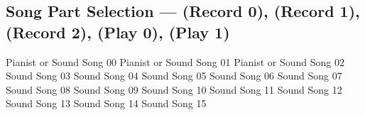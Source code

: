 \subsection[Song Part Selection]{Song Part Selection --- \UiKey{\I}\UiKey{\REC} (Record 0), \UiKey{\II}\UiKey{\REC} (Record 1), \UiKey{\I}\UiKey{\II}\UiKey{\REC} (Record 2), \UiKey{\I}\UiKey{\PL} (Play 0), \UiKey{\II}\UiKey{\PL} (Play 1)}
Pianist or Sound Song 00
Pianist or Sound Song 01
Pianist or Sound Song 02
Sound Song 03
Sound Song 04
Sound Song 05
Sound Song 06
Sound Song 07
Sound Song 08
Sound Song 09
Sound Song 10
Sound Song 11
Sound Song 12
Sound Song 13
Sound Song 14
Sound Song 15

